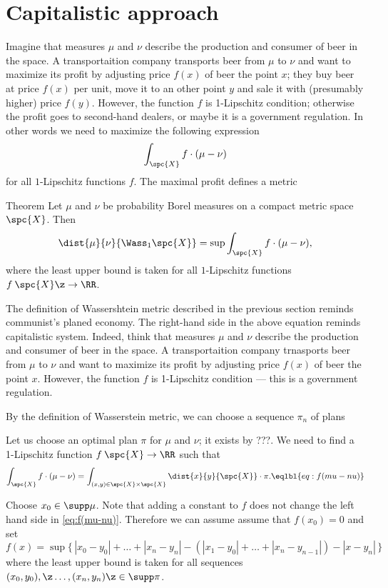 \section{Capitalistic approach}

Imagine that measures $\mu$ and $\nu$ describe the production and consumer of beer in the space.
A transportaition company transports beer from $\mu$ to $\nu$ and want to maximize its profit by adjusting price $f(x)$ of beer the point $x$; they buy beer at price $f(x)$ per unit, move it to an other point $y$ and sale it with (presumably higher) price $f(y)$.
However, the function $f$ is 1-Lipschitz condition;
otherwise the profit goes to second-hand dealers, or maybe it is a government regulation.
In other words we need to maximize the following expression
\[\int_{\spc{X}} f\cdot(\mu-\nu)\]
for all $1$-Lipschitz functions $f$.
The maximal profit defines a metric

\begin{thm}{Theorem}
Let $\mu$ and $\nu$ be probability Borel measures on a compact metric space $\spc{X}$.
Then
\[\dist{\mu}{\nu}{\Wass_1\spc{X}}=\sup\int_{\spc{X}} f\cdot(\mu-\nu),\]
where the least upper bound is taken for all $1$-Lipschitz functions $f\:\spc{X}\z\to\RR$.
\end{thm}

The definition of Wassershtein metric described in the previous section reminds communist's planed economy.
The right-hand side in the above equation reminds capitalistic system.
Indeed, think that measures $\mu$ and $\nu$ describe the production and consumer of beer in the space.
A transportaition company trnasports beer from $\mu$ to $\nu$ and want to maximize its profit by adjusting price $f(x)$ of beer the point $x$.
However, the function $f$ is 1-Lipschitz condition --- this is a government regulation.




By the definition of Wasserstein metric, we can choose a sequence $\pi_n$ of plans  

Let us choose an optimal plan $\pi$ for $\mu$ and $\nu$; it exists by ???.
We need to find a 1-Lipschitz function $f\:\spc{X}\to\RR$ such that 
\[
\int_{\spc{X}} f\cdot(\mu-\nu)=\int_{(x,y)\in\spc{X}\times\spc{X}}\dist{x}{y}{\spc{X}}\cdot \pi.
\eqlbl{eq:f(mu-nu)}
\]

Choose $x_0\in \supp\mu$.
Note that adding a constant to $f$ does not change the left hand side in \ref{eq:f(mu-nu)}.
Therefore we can assume assume that $f(x_0)=0$ and set
\[f(x)=\sup\{\,|x_0-y_0|+\dots+|x_n-y_n|-(|x_1-y_0|+\dots+|x_n-y_{n-1}|)-|x-y_n|\,\}\]
where the least upper bound is taken for all sequences $(x_0,y_0),\z\dots,(x_n,y_n)\z\in\supp\pi$.

